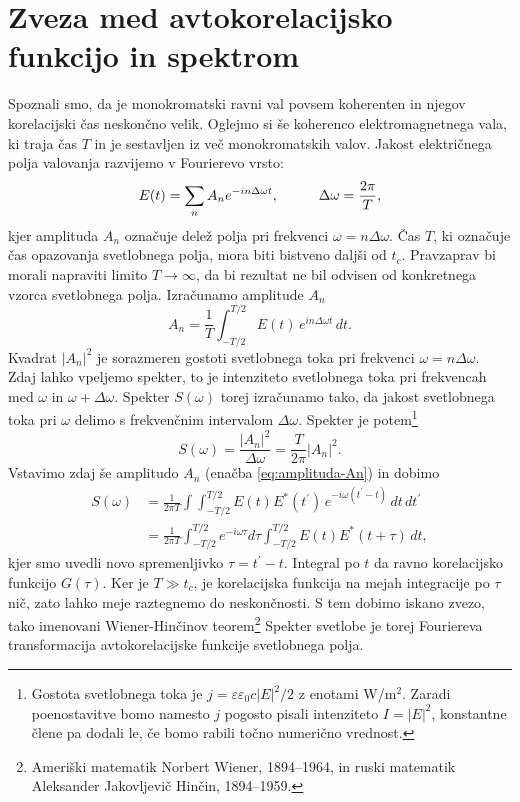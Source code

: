 \section{Zveza med avtokorelacijsko funkcijo in spektrom}

Spoznali smo, da je monokromatski ravni val povsem koherenten in njegov
korelacijski čas neskončno velik. Oglejmo si še koherenco elektromagnetnega
vala, ki traja čas $T$ in je sestavljen iz več monokromatskih valov. Jakost električnega
polja valovanja razvijemo v Fourierevo vrsto: 
\begin{equation}
E(t)=\sum_{n}A_{n}e^{-in\Delta\omega t},\mbox{\hskip1cm}\Delta\omega=\frac{2\pi}{T},
\end{equation}
kjer amplituda $A_{n}$ označuje delež polja pri frekvenci $\omega=n\Delta\omega$.
Čas $T$, ki označuje čas opazovanja svetlobnega polja, mora biti
bistveno daljši od $t_{c}$. Pravzaprav bi morali napraviti limito
$T\rightarrow\infty$, da bi rezultat ne bil odvisen od konkretnega
vzorca svetlobnega polja. Izračunamo amplitude $A_{n}$ 
\begin{equation}
A_{n}=\frac{1}{T}\int_{-T/2}^{T/2}E(t)\, e^{in\Delta\omega t}\, dt.\label{eq:amplituda-An}
\end{equation}
Kvadrat $|A_{n}|^{2}$ je sorazmeren gostoti svetlobnega toka pri frekvenci
$\omega=n\Delta\omega$. 
Zdaj lahko vpeljemo spekter, to
je intenziteto svetlobnega toka pri frekvencah med $\omega$ in $\omega+\Delta\omega$.
Spekter $S(\omega)$ torej izračunamo tako, da jakost svetlobnega
toka pri $\omega$ delimo s frekvenčnim intervalom 
$\Delta\omega$.
Spekter je potem\footnote{Gostota svetlobnega toka je $j = \varepsilon \varepsilon_0 c |E|^2/2$
z enotami W/m$^2$. Zaradi poenostavitve bomo namesto $j$ pogosto pisali intenziteto 
$I = |E|^2$, konstantne člene pa dodali le, če bomo rabili točno numerično vrednost.} 
\begin{equation}
S(\omega)=\frac{|A_{n}|^{2}}{\Delta\omega}=\frac{T}{2\pi}|A_{n}|^{2}.
\end{equation}
Vstavimo zdaj še amplitudo $A_{n}$ (enačba \ref{eq:amplituda-An}) in dobimo 
\begin{align}
S(\omega) & =\frac{1}{2\pi T}\int\int_{-T/2}^{T/2}E(t)E^{*}(t^{\prime})\, 
e^{-i\omega(t^{\prime}-t)}\, dt\, dt^{\prime}\\
 & =\frac{1}{2\pi T}\int_{-T/2}^{T/2}e^{-i\omega\tau}d\tau\int_{-T/2}^{T/2}E(t)E^{*}(t+\tau)\, dt,
\label{eq:spekter}
\end{align}
kjer smo uvedli novo spremenljivko $\tau=t^{\prime}-t$. Integral
po $t$ da ravno korelacijsko funkcijo $G(\tau)$. Ker je $T\gg t_{c}$,
je korelacijska funkcija na mejah integracije po $\tau$ nič, zato
lahko meje raztegnemo do neskončnosti. S tem dobimo iskano zvezo, tako imenovani
Wiener-Hinčinov teorem\footnote{Ameriški matematik Norbert Wiener, 1894--1964, in 
ruski matematik Aleksander Jakovljevič Hinčin, 1894--1959.}
Spekter svetlobe je torej Fouriereva transformacija avtokorelacijske
funkcije svetlobnega polja. 

